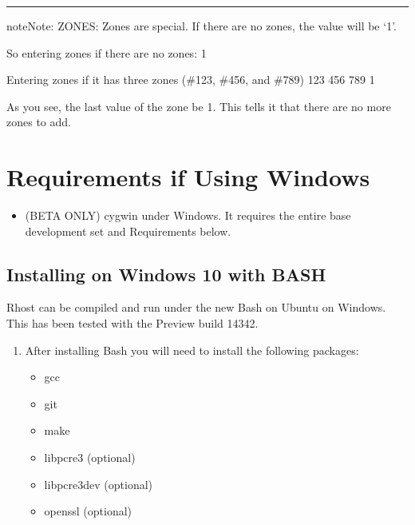 \documentclass[letterpaper,10pt,english]{sphinxmanual}
\begin{document}
\bigskip\hrule\bigskip


\begin{sphinxadmonition}{note}{Note:}
\sphinxAtStartPar
ZONES:  Zones are special.  If there are no zones, the value will be ‘\sphinxhyphen{}1’.
\end{sphinxadmonition}

\sphinxAtStartPar
So entering zones if there are no zones:
\sphinxhyphen{}1

\sphinxAtStartPar
Entering zones if it has three zones (\#123, \#456, and \#789)
123
456
789
\sphinxhyphen{}1

\sphinxAtStartPar
As you see, the last value of the zone  be \sphinxhyphen{}1.  This tells it
that there are no more zones to add.


\chapter{Requirements if Using Windows}
\label{\detokenize{windows:requirements-if-using-windows}}\label{\detokenize{windows:windows-requirements}}\label{\detokenize{windows::doc}}\begin{itemize}
\item {} 
\sphinxAtStartPar
(BETA ONLY) cygwin under Windows.  It requires the entire base development set and Requirements below.

\end{itemize}


\section{Installing on Windows 10 with BASH}
\label{\detokenize{windows:installing-on-windows-10-with-bash}}
\sphinxAtStartPar
Rhost can be compiled and run under the new Bash on Ubuntu on Windows.
This has been tested with the Preview build 14342.
\begin{enumerate}
%
\item {} 
\sphinxAtStartPar
After installing Bash you will need to install the following packages:
\begin{itemize}
\item {} 
\sphinxAtStartPar
gcc

\item {} 
\sphinxAtStartPar
git

\item {} 
\sphinxAtStartPar
make

\item {} 
\sphinxAtStartPar
libpcre3 (optional)

\item {} 
\sphinxAtStartPar
libpcre3\sphinxhyphen{}dev (optional)

\item {} 
\sphinxAtStartPar
openssl (optional)

\end{itemize}

\end{enumerate}
\end{document}
